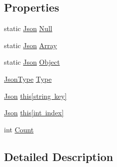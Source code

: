 \subsection*{Properties}
\begin{DoxyCompactItemize}
\item 
static \mbox{\hyperlink{class_eagle_eye_1_1_models_1_1_json}{Json}} \mbox{\hyperlink{class_eagle_eye_1_1_models_1_1_json_a5a747d9202e52fdcfba6fd6cc821d5f0}{Null}}
\item 
static \mbox{\hyperlink{class_eagle_eye_1_1_models_1_1_json}{Json}} \mbox{\hyperlink{class_eagle_eye_1_1_models_1_1_json_a35e8187d23b3971fe9064b643fe66a5a}{Array}}
\item 
static \mbox{\hyperlink{class_eagle_eye_1_1_models_1_1_json}{Json}} \mbox{\hyperlink{class_eagle_eye_1_1_models_1_1_json_a2196bd75222570b3e481efc887c28bf5}{Object}}
\item 
\mbox{\hyperlink{class_eagle_eye_1_1_models_1_1_json_afdf0e16163f8b9bab5b45d6d01e8133c}{Json\+Type}} \mbox{\hyperlink{class_eagle_eye_1_1_models_1_1_json_a8b9b9f8ed1df50c3d00d2bd7cbbd9e46}{Type}}
\item 
\mbox{\hyperlink{class_eagle_eye_1_1_models_1_1_json}{Json}} \mbox{\hyperlink{class_eagle_eye_1_1_models_1_1_json_a5406f24d73c683b7cfd14fcc16e1292b}{this\mbox{[}string key\mbox{]}}}
\item 
\mbox{\hyperlink{class_eagle_eye_1_1_models_1_1_json}{Json}} \mbox{\hyperlink{class_eagle_eye_1_1_models_1_1_json_a6a06a70ad6294d135adfa0d66b8b5978}{this\mbox{[}int index\mbox{]}}}
\item 
int \mbox{\hyperlink{class_eagle_eye_1_1_models_1_1_json_a3f1f39dbe0728fa7591a88435c5ce7b4}{Count}}
\end{DoxyCompactItemize}


\subsection{Detailed Description}




